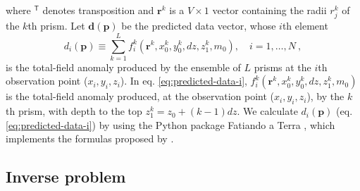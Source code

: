 where $^{\mathsf{T}}$ denotes transposition and $\mathbf{r}^{k}$ is a $V \times 1$ vector containing the radii $r^{k}_{j}$ 
of the $k$th prism.
Let $\mathbf{d} (\mathbf{p})$ be the predicted data vector, whose $i$th element 
\begin{equation}
d_{i} (\mathbf{p}) \equiv \sum\limits_{k=1}^{L} f_{i}^{k}(\mathbf{r}^{k}, x_{0}^{k}, y_{0}^{k}, dz, z_{1}^{k}, m_{0}), \quad i = 1, \dots, N \: ,
\label{eq:predicted-data-i}
\end{equation}
is the total-field anomaly produced by the ensemble of $L$ prisms at the $i$th observation point ($x_{i}, y_{i}, z_{i}$). 
In eq. \ref{eq:predicted-data-i}, $f_{i}^{k}(\mathbf{r}^{k}, x_{0}^{k}, y_{0}^{k}, dz, z_{1}^{k}, m_{0})$ is the total-field anomaly 
produced, at the observation point ($x_{i}, y_{i}, z_{i}$), by the $k$th prism, with depth to the top $z_{1}^{k} = z_{0} + (k-1)dz$.
We calculate $d_{i} (\mathbf{p})$ (eq. \ref{eq:predicted-data-i}) by using the Python package Fatiando a Terra \citep{uieda-etal2013}, 
which implements the formulas proposed by \cite{plouff1976}.

\subsection{Inverse problem}

